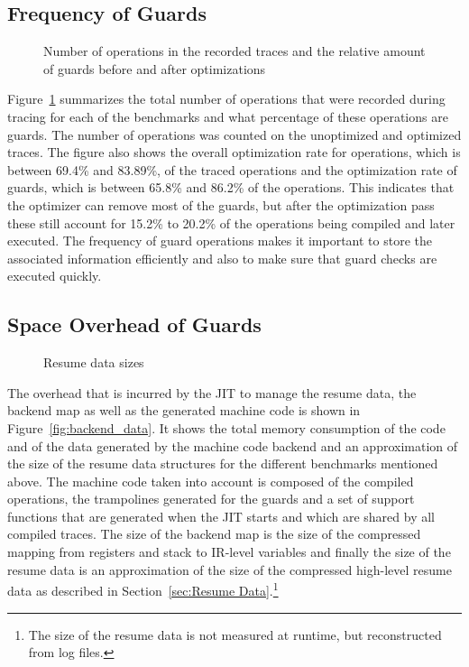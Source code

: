 \documentclass[10pt,preprint]{sigplanconf}
\begin{document}
\subsection{Frequency of Guards}
\label{sub:guard_frequency}
\begin{figure}
    
    \caption{Number of operations in the recorded traces and the relative amount of guards before and after optimizations}
    \label{fig:benchmarks}
\end{figure}

Figure~\ref{fig:benchmarks} summarizes the total number of operations that were
recorded during tracing for each of the benchmarks and what percentage of these
operations are guards. The number of operations was counted on the unoptimized
and optimized traces. The figure also shows the overall optimization rate for
operations, which is between 69.4\% and 83.89\%, of the traced operations and the
optimization rate of guards, which is between 65.8\% and 86.2\% of the
operations. This indicates that the optimizer can remove
most of the guards, but after the optimization pass these still account for
15.2\% to 20.2\% of the operations being compiled and later executed.
The frequency of guard operations makes it important to store the associated
information efficiently and also to make sure that guard checks are executed
quickly.

\subsection{Space Overhead of Guards}
\label{sub:guard_overhead}
\begin{figure}
    
    \caption{Resume data sizes}
    \label{fig:resume_data_sizes}
\end{figure}

The overhead that is incurred by the JIT to manage the resume data,
the backend map as well as the generated machine code is
shown in Figure~\ref{fig:backend_data}. It shows the total memory consumption
of the code and of the data generated by the machine code backend and an
approximation of the size of the resume data structures for the
different benchmarks mentioned above. The machine code taken into account is
composed of the compiled operations, the trampolines generated for the guards
and a set of support functions that are generated when the JIT starts and which
are shared by all compiled traces. The size of the backend map
is the size of the compressed mapping from registers and stack to
IR-level variables and finally the size of the resume data is an
approximation of the size of the compressed high-level resume data as described
in Section~\ref{sec:Resume Data}.\footnote{
The size of the resume data is not measured at runtime, but reconstructed from
log files.}
\end{document}

